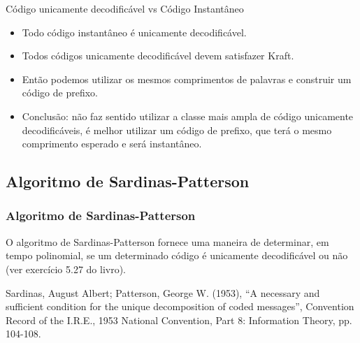 \begin{frame}[allowframebreaks]
  Código unicamente decodificável vs Código Instantâneo
  \begin{itemize}
  \item Todo código instantâneo é unicamente decodificável.
  \item Todos códigos unicamente decodificável devem satisfazer Kraft.
  \item Então podemos utilizar os mesmos comprimentos de palavras e construir um código de prefixo.
  \item Conclusão: não faz sentido utilizar a classe mais ampla de código unicamente decodificáveis, 
	é melhor utilizar um código de prefixo, que terá o mesmo comprimento esperado e será
	instantâneo.
  \end{itemize}
\end{frame}

\subsection{Algoritmo de Sardinas-Patterson}
\begin{frame}[allowframebreaks]
  \frametitle{Algoritmo de Sardinas-Patterson}

  O algoritmo de Sardinas-Patterson fornece uma maneira de determinar, em tempo polinomial, 
  se um determinado código é unicamente decodificável ou não (ver exercício 5.27 do livro).


  \vspace{5em}
  Sardinas, August Albert; Patterson, George W. (1953), ``A necessary and sufficient condition
  for the unique decomposition of coded messages'', Convention Record of the I.R.E., 1953
  National Convention, Part 8: Information Theory, pp. 104-108.
\end{frame}

